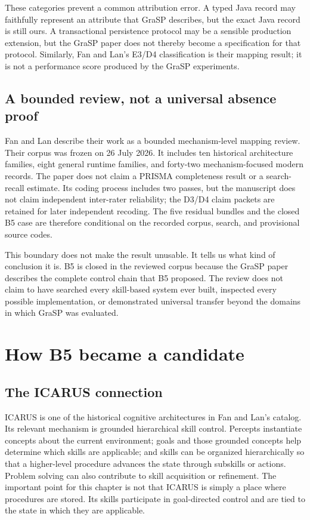 These categories prevent a common attribution error. A typed Java record may faithfully represent an attribute that GraSP describes, but the exact Java record is still ours. A transactional persistence protocol may be a sensible production extension, but the GraSP paper does not thereby become a specification for that protocol. Similarly, Fan and Lan's E3/D4 classification is their mapping result; it is not a performance score produced by the GraSP experiments.

\subsection{A bounded review, not a universal absence proof}

Fan and Lan describe their work as a bounded mechanism-level mapping review. Their corpus was frozen on 26 July 2026. It includes ten historical architecture families, eight general runtime families, and forty-two mechanism-focused modern records. The paper does not claim a PRISMA completeness result or a search-recall estimate. Its coding process includes two passes, but the manuscript does not claim independent inter-rater reliability; the D3/D4 claim packets are retained for later independent recoding. The five residual bundles and the closed B5 case are therefore conditional on the recorded corpus, search, and provisional source codes.

This boundary does not make the result unusable. It tells us what kind of conclusion it is. B5 is closed in the reviewed corpus because the GraSP paper describes the complete control chain that B5 proposed. The review does not claim to have searched every skill-based system ever built, inspected every possible implementation, or demonstrated universal transfer beyond the domains in which GraSP was evaluated.

\section{How B5 became a candidate}
\label{sec:ch17-b5-candidate}

\subsection{The ICARUS connection}

ICARUS is one of the historical cognitive architectures in Fan and Lan's catalog. Its relevant mechanism is grounded hierarchical skill control. Percepts instantiate concepts about the current environment; goals and those grounded concepts help determine which skills are applicable; and skills can be organized hierarchically so that a higher-level procedure advances the state through subskills or actions. Problem solving can also contribute to skill acquisition or refinement. The important point for this chapter is not that ICARUS is simply a place where procedures are stored. Its skills participate in goal-directed control and are tied to the state in which they are applicable.\autocite{choi2018icarus}

